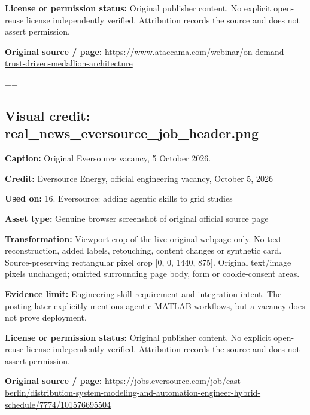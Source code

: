 \documentclass[10pt,letterpaper]{article}
\begin{document}
\textbf{License or permission status:} Original publisher content. No explicit open-reuse license independently verified. Attribution records the source and does not assert permission.\par
\textbf{Original source / page:} \href{https://www.ataccama.com/webinar/on-demand-trust-driven-medallion-architecture}{\small\ttfamily https:/\allowbreak{}/\allowbreak{}www.\allowbreak{}ataccama.\allowbreak{}com/\allowbreak{}webinar/\allowbreak{}on-\allowbreak{}demand-\allowbreak{}trust-\allowbreak{}driven-\allowbreak{}medallion-\allowbreak{}architecture}\par
\egroup\par\noindent\box\readingEntry\par\medskip
\setbox\readingEntry=\vbox\bgroup\hsize=\linewidth\subsection*{Visual credit: real\_news\_eversource\_job\_header.png}
\textbf{Caption:} Original Eversource vacancy, 5 October 2026.\par
\textbf{Credit:} Eversource Energy, official engineering vacancy, October 5, 2026\par
\textbf{Used on:} 16. Eversource: adding agentic skills to grid studies\par
\textbf{Asset type:} Genuine browser screenshot of original official source page\par
\textbf{Transformation:} Viewport crop of the live original webpage only. No text reconstruction, added labels, retouching, content changes or synthetic card. Source-preserving rectangular pixel crop [0, 0, 1440, 875]. Original text/image pixels unchanged; omitted surrounding page body, form or cookie-consent areas.\par
\textbf{Evidence limit:} Engineering skill requirement and integration intent. The posting later explicitly mentions agentic MATLAB workflows, but a vacancy does not prove deployment.\par
\textbf{License or permission status:} Original publisher content. No explicit open-reuse license independently verified. Attribution records the source and does not assert permission.\par
\textbf{Original source / page:} \href{https://jobs.eversource.com/job/east-berlin/distribution-system-modeling-and-automation-engineer-hybrid-schedule/7774/101576695504}{\small\ttfamily https:/\allowbreak{}/\allowbreak{}jobs.\allowbreak{}eversource.\allowbreak{}com/\allowbreak{}job/\allowbreak{}east-\allowbreak{}berlin/\allowbreak{}distribution-\allowbreak{}system-\allowbreak{}modeling-\allowbreak{}and-\allowbreak{}automation-\allowbreak{}engineer-\allowbreak{}hybrid-\allowbreak{}schedule/\allowbreak{}7774/\allowbreak{}101576695504}\par
\end{document}
